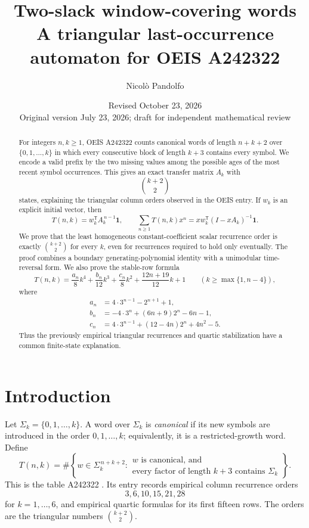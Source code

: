 \documentclass[11pt]{article}
\title{\textbf{Two-slack window-covering words}\\
\large A triangular last-occurrence automaton for OEIS A242322}
\author{Nicol\`o Pandolfo}
\date{Revised October 23, 2026\\
\small Original version July 23, 2026; draft for independent mathematical review}
\theoremstyle{remark}
\newcommand{\one}{\boldsymbol 1}
\begin{document}
\maketitle

\begin{abstract}
For integers $n,k\geq1$, OEIS A242322 counts canonical words of length
$n+k+2$ over $\{0,1,\ldots,k\}$ in which every consecutive block of length
$k+3$ contains every symbol.  We encode a valid prefix by the two missing
values among the possible ages of the most recent symbol occurrences.  This
gives an exact transfer matrix $A_k$ with
\[
 \binom{k+2}{2}
\]
states, explaining the triangular column orders observed in the OEIS entry.
If $w_k$ is an explicit initial vector, then
\[
 T(n,k)=w_k^{\mathsf T}A_k^{\,n-1}\one,\qquad
 \sum_{n\geq1}T(n,k)x^n
 =xw_k^{\mathsf T}(I-xA_k)^{-1}\one.
\]
We prove that the least homogeneous constant-coefficient scalar recurrence order is exactly
$\binom{k+2}{2}$ for every $k$, even for recurrences required to hold only
eventually.  The proof combines a boundary generating-polynomial identity
with a unimodular time-reversal form.  We also prove the stable-row formula
\[
 T(n,k)=\frac{a_n}{8}k^4+\frac{b_n}{12}k^3
       +\frac{c_n}{8}k^2+\frac{12n+19}{12}k+1
 \qquad (k\geq\max\{1,n-4\}),
\]
where
\[
\begin{aligned}
 a_n&=4\cdot3^{n-1}-2^{n+1}+1,\\
 b_n&=-4\cdot3^n+(6n+9)2^n-6n-1,\\
 c_n&=4\cdot3^{n-1}+(12-4n)2^n+4n^2-5.
\end{aligned}
\]
Thus the previously empirical triangular recurrences and quartic
stabilization have a common finite-state explanation.
\end{abstract}

\section{Introduction}

Let $\Sigma_k=\{0,1,\ldots,k\}$.  A word over $\Sigma_k$ is
\emph{canonical} if its new symbols are introduced in the order
$0,1,\ldots,k$; equivalently, it is a restricted-growth word.  Define
\begin{equation}\label{eq:def}
 T(n,k)=\#\left\{
 w\in\Sigma_k^{\,n+k+2}:
 \begin{array}{l}
 w\text{ is canonical, and}\\
 \text{every factor of length }k+3\text{ contains }\Sigma_k
 \end{array}\right\}.
\end{equation}
This is the table A242322 \cite{oeisA242322}.  Its entry records empirical
column recurrence orders
\[
 3,6,10,15,21,28
\]
for $k=1,\ldots,6$, and empirical quartic formulas for its first fifteen
rows.  The orders are the triangular numbers $\binom{k+2}{2}$.
\end{document}

